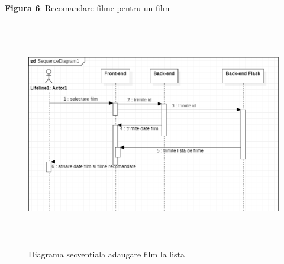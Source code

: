 \par \textbf{Figura 6}: Recomandare filme pentru un film
		\begin{figure}[!h]
			\centerline{\includegraphics[width=14cm, height=10cm]{figures/recomandarea de filme.png}}
			\caption{Diagrama secventiala adaugare film la lista}
			\label{fig}
		\end{figure}


